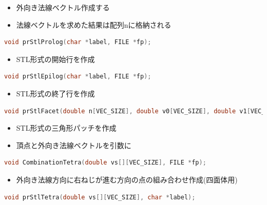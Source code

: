 \documentclass[a4paper,10pt]{jsarticle}
\begin{document}
\begin{itemize}
 \item 外向き法線ベクトル作成する
 \item 法線ベクトルを求めた結果は配列nに格納される
\end{itemize}

\begin{lstlisting}[basicstyle=\ttfamily\footnotesize, language=C, frame=single, numbers=none, breaklines=true]
void prStlProlog(char *label, FILE *fp);
\end{lstlisting}

\begin{itemize}
 \item STL形式の開始行を作成
\end{itemize}

\begin{lstlisting}[basicstyle=\ttfamily\footnotesize, language=C, frame=single, numbers=none, breaklines=true]
void prStlEpilog(char *label, FILE *fp);
\end{lstlisting}

\begin{itemize}
 \item STL形式の終了行を作成
\end{itemize}

\begin{lstlisting}[basicstyle=\ttfamily\footnotesize, language=C, frame=single, numbers=none, breaklines=true]
void prStlFacet(double n[VEC_SIZE], double v0[VEC_SIZE], double v1[VEC_SIZE], double v2[VEC_SIZE], FILE *fp);
\end{lstlisting}

\begin{itemize}
 \item STL形式の三角形パッチを作成
 \item 頂点と外向き法線ベクトルを引数に
\end{itemize}

\begin{lstlisting}[basicstyle=\ttfamily\footnotesize, language=C, frame=single, numbers=none, breaklines=true]
void CombinationTetra(double vs[][VEC_SIZE], FILE *fp);
\end{lstlisting}

\begin{itemize}
 \item 外向き法線方向に右ねじが進む方向の点の組み合わせ作成(四面体用)
\end{itemize}

\begin{lstlisting}[basicstyle=\ttfamily\footnotesize, language=C, frame=single, numbers=none, breaklines=true]
void prStlTetra(double vs[][VEC_SIZE], char *label);
\end{lstlisting}
\end{document}
